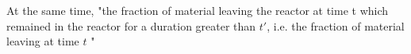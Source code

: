 At the same time, "the fraction of material leaving the reactor at time t which remained in the reactor for a duration greater than $t'$, i.e. the fraction of material leaving at time $t$ "  